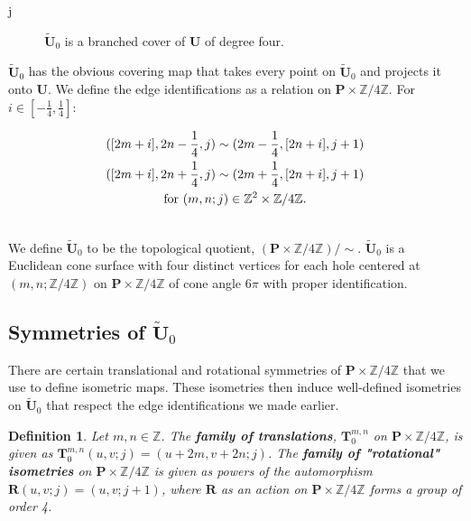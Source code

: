 j\documentclass[]{article}
\newtheorem{Def}{Definition}[subsection]
\begin{document}
\begin{figure}[H]
\centering

\label{fig:utilda0}
\caption{$\tilde{\mathbf{U}}_0$ is a branched cover of $\mathbf{U}$ of degree four.}
\end{figure}

$\tilde{\mathbf{U}}_0$ has the obvious covering map that takes every point on $\tilde{\mathbf{U}}_0$ and projects it onto $\mathbf{U}$. We define the edge identifications as a relation on $\mathbf{P}\times\mathbb{Z}/4\mathbb{Z}$. For $i\in[-\frac{1}{4},\frac{1}{4}]$:


\begin{multline}
([2m+i], 2n-\frac{1}{4},j)\sim(2m-\frac{1}{4},[2n+i],j+1)\\
([2m+i], 2n+\frac{1}{4},j)\sim(2m+\frac{1}{4},[2n+i],j+1)\\
\vspace{0.2in}\text{for } (m,n;j) \in \mathbb{Z}^{2}\times\mathbb{Z}/4\mathbb{Z}.
\label{eq:rel2}
\end{multline}

We define $\tilde{\mathbf{U}}_0$ to be the topological quotient, $(\mathbf{P}\times\mathbb{Z}/4\mathbb{Z})/\sim$. $\tilde{\mathbf{U}}_0$ is a Euclidean cone surface with four distinct vertices for each hole centered at $(m,n;\mathbb{Z}/4\mathbb{Z})$ on $\mathbf{P}\times\mathbb{Z}/4\mathbb{Z}$ of cone angle $6\pi$ with proper identification.

\subsection{Symmetries of $\tilde{\mathbf{U}}_0$}
There are certain translational and rotational symmetries of $\mathbf{P}\times\mathbb{Z}/4\mathbb{Z}$ that we use to define isometric maps. These isometries then induce well-defined isometries on $\tilde{\mathbf{U}}_0$ that respect the edge identifications we made earlier.

\begin{Def}Let $m,n\in\mathbb{Z}$. The \textbf{family of translations}, $\mathbf{T}^{m,n}_{0}$ on $\mathbf{P}\times\mathbb{Z}/4\mathbb{Z}$, is given as $\mathbf{T}^{m,n}_{0}(u,v;j)=(u+2m,v+2n;j)$.\newline
The \textbf{family of "rotational" isometries} on $\mathbf{P}\times\mathbb{Z}/4\mathbb{Z}$ is given as powers of the automorphism $\mathbf{R}(u,v;j)=(u,v;j+1)$, where $\mathbf{R}$ as an action on $\mathbf{P}\times\mathbb{Z}/4\mathbb{Z}$ forms a group of order 4.
\end{Def}
\end{document}
